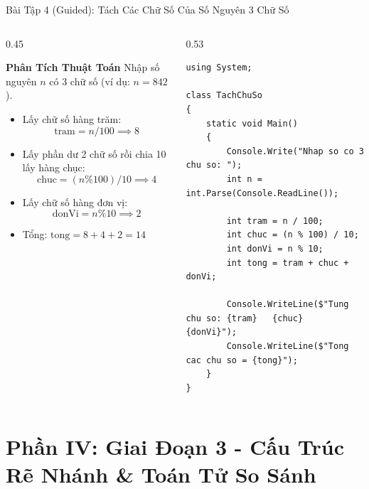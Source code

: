 \documentclass[aspectratio=169, 10pt]{beamer}
\begin{document}
\begin{frame}[fragile]{Bài Tập 4 (Guided): Tách Các Chữ Số Của Số Nguyên 3 Chữ Số}
  \begin{columns}[T]
    \begin{column}{0.45\textwidth}
      \begin{block}{\textbf{Phân Tích Thuật Toán}}
        Nhập số nguyên $n$ có 3 chữ số (ví dụ: $n = 842$).
        \begin{itemize}
          \item Lấy chữ số hàng trăm:
            \[ \text{tram} = n / 100 \implies 8 \]
          \item Lấy phần dư 2 chữ số rồi chia 10 lấy hàng chục:
            \[ \text{chuc} = (n \% 100) / 10 \implies 4 \]
          \item Lấy chữ số hàng đơn vị:
            \[ \text{donVi} = n \% 10 \implies 2 \]
          \item Tổng: $\text{tong} = 8 + 4 + 2 = 14$
        \end{itemize}
      \end{block}
    \end{column}
    \begin{column}{0.53\textwidth}
\begin{lstlisting}
using System;

class TachChuSo
{
    static void Main()
    {
        Console.Write("Nhap so co 3 chu so: ");
        int n = int.Parse(Console.ReadLine());

        int tram = n / 100;
        int chuc = (n % 100) / 10;
        int donVi = n % 10;
        int tong = tram + chuc + donVi;

        Console.WriteLine($"Tung chu so: {tram}   {chuc}   {donVi}");
        Console.WriteLine($"Tong cac chu so = {tong}");
    }
}
\end{lstlisting}
    \end{column}
  \end{columns}
\end{frame}

\section{Phần IV: Giai Đoạn 3 - Cấu Trúc Rẽ Nhánh \& Toán Tử So Sánh}
\end{document}
